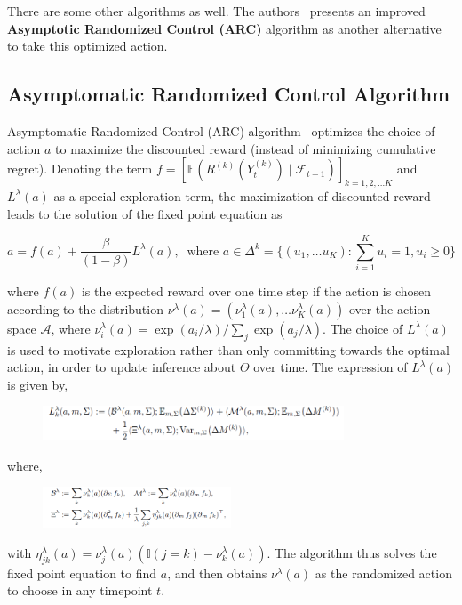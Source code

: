 \documentclass[11pt]{article}
\newcommand{\E}{\mathbb{E}}
\newcommand{\Acal}{\mathcal{A}}
\newcommand{\Fcal}{\mathcal{F}}
\begin{document}
There are some other algorithms as well. The authors~\cite{treetanthiploet2021correlated} presents an improved \textbf{Asymptotic Randomized Control (ARC)} algorithm as another alternative to take this optimized action.  

\subsection{Asymptomatic Randomized Control Algorithm}

Asymptomatic Randomized Control (ARC) algorithm~\cite{cohen2020asymptotic} optimizes the choice of action $a$ to maximize the discounted reward (instead of minimizing cumulative regret). Denoting the term $f = [\E(R^{(k)}(Y_t^{(k)}) \mid \Fcal_{t-1})]_{k=1,2,\dots K}$ and $L^\lambda(a)$ as a special exploration term, the maximization of discounted reward leads to the solution of the fixed point equation as

$$
a = f(a) + \dfrac{\beta}{(1 - \beta)}L^\lambda(a), \ \text{ where } a \in \Delta^k = \{ (u_1, \dots u_K) : \sum_{i=1}^K u_i = 1, u_i \geq 0 \}
$$

\noindent where $f(a)$ is the expected reward over one time step if the action is chosen according to the distribution $\nu^\lambda(a) = (\nu^\lambda_1(a), \dots \nu^\lambda_K(a))$ over the action space $\Acal$, where $\nu_i^\lambda(a) = \exp(a_i/\lambda)/\sum_{j} \exp(a_j/\lambda)$. The choice of $L^\lambda(a)$ is used to motivate exploration rather than only committing towards the optimal action, in order to update inference about $\Theta$ over time. The expression of $L^\lambda(a)$ is given by,

\begin{figure}[h]
    \centering
    \includegraphics[width = 0.8\textwidth]{img1.PNG}
\end{figure}

\noindent where,

\begin{figure}[h]
    \centering
    \includegraphics[width = 0.5\textwidth]{img2.PNG}
\end{figure}

\noindent with $\eta^\lambda_{jk}(a) = \nu^\lambda_j(a)(\mathbb{I}(j = k) - \nu^\lambda_k(a))$. The algorithm thus solves the fixed point equation to find $a$, and then obtains $\nu^\lambda(a)$ as the randomized action to choose in any timepoint $t$.
\end{document}
